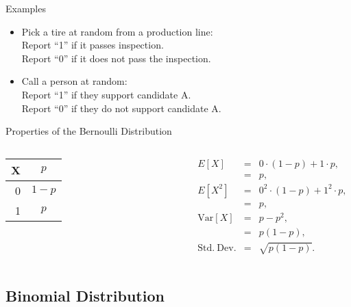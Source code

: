 \begin{frame}{Examples}

  \begin{itemize}
  \item Pick a tire at random from a production line: \\
    Report ``1'' if it passes inspection. \\
    Report ``0'' if it does not pass the inspection.
  \item Call a person at random: \\
    Report ``1'' if they support candidate A. \\
    Report ``0'' if they do not support candidate A.

  \end{itemize}
  
\end{frame}

\begin{frame}{Properties of the Bernoulli Distribution}

  \begin{columns}
    \begin{tabular}{r|c}
      X & $p$ \\ \hline
      0 & $1-p$ \\
      1 & $p$
    \end{tabular}

    \begin{eqnarray*}
      E[X] & = & 0\cdot (1-p) + 1\cdot p, \\
      & = & p, \\
      E[X^2] & = & 0^2\cdot (1-p) + 1^2\cdot p, \\
      & = & p, \\
      \mathrm{Var}[X] & = & p - p^2, \\
      & = & p(1-p), \\
      \mathrm{Std.~Dev.} & = & \sqrt{p(1-p)}.
    \end{eqnarray*}
  \end{columns}
\end{frame}

\subsection{Binomial Distribution}

